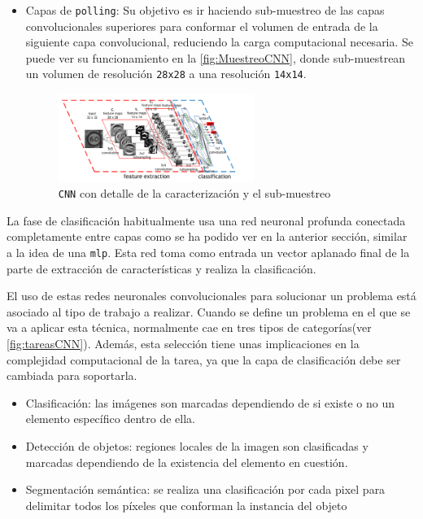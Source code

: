 \begin{itemize}
    \item Capas de \texttt{polling}: Su objetivo es ir haciendo sub-muestreo de las capas convolucionales superiores para conformar el volumen de entrada de la siguiente capa convolucional, reduciendo la carga computacional necesaria. 
    Se puede ver su funcionamiento en la \autoref{fig:MuestreoCNN}, donde sub-muestrean un volumen de resolución \texttt{28x28} a una resolución \texttt{14x14}.
    \begin{figure}[H]
        \centering
        \includegraphics[width=0.6\textwidth]{images/4/EjemploPolling.png}
        \caption{\texttt{CNN} con detalle de la caracterización y el sub-muestreo\cite{ConvolutionalNeuralNetwork}}
        \label{fig:MuestreoCNN}
    \end{figure}

\end{itemize}

La fase de clasificación habitualmente usa una red neuronal profunda conectada completamente entre capas como se ha podido ver en la anterior sección, similar a la idea de una \texttt{\acrshort{mlp}}. Esta 
red toma como entrada un vector aplanado final de la parte de extracción de características y realiza la clasificación.
\clearpage


El uso de estas redes neuronales convolucionales para solucionar un problema está asociado al tipo de trabajo a realizar. Cuando se define un problema en el que se va a aplicar esta técnica, normalmente 
cae en tres tipos de categorías(ver \autoref{fig:tareasCNN}). Además, esta selección tiene unas implicaciones en la complejidad computacional de la tarea, ya que la capa de clasificación debe ser cambiada para soportarla.

\begin{itemize}
    \item Clasificación: las imágenes son marcadas dependiendo de si existe o no un elemento específico dentro de ella.
    \item Detección de objetos: regiones locales de la imagen son clasificadas y marcadas dependiendo de la existencia del elemento en cuestión.
    \item Segmentación semántica: se realiza una clasificación por cada pixel para delimitar todos los píxeles que conforman la instancia del objeto
\end{itemize}

